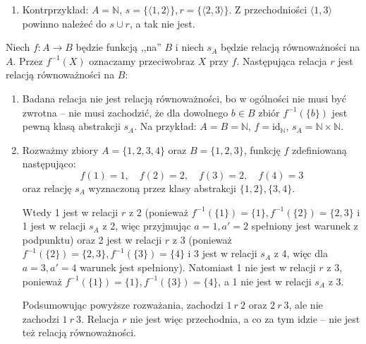 \begin{solutions}
\begin{enumerate}[\bf A.]
        \item Kontrprzykład: $A = \mathbb{N}$, $s = \{ \langle 1, 2 \rangle \}, r = \{ \langle 2, 3 \rangle \}$. Z przechodniości $\langle 1, 3 \rangle$ powinno należeć do $s \cup r$, a tak nie jest.
    \end{enumerate}

    \sol Niech $f:A\rightarrow B$ będzie funkcją ,,na'' $B$ i niech $s_A$ będzie relacją równoważności na $A$. Przez $f^{-1}(X)$ oznaczamy przeciwobraz $X$ przy $f$. Następująca relacja $r$ jest relacją równoważności na $B$:

    \begin{enumerate}[\bf A.]
        \item Badana relacja nie jest relacją równoważności, bo w ogólności nie musi być zwrotna -- nie musi zachodzić, że dla dowolnego $b \in B$ zbiór $f^{-1}(\{b\})$ jest pewną klasą abstrakcji $s_A$. Na przykład: $A = B = \mathbb{N}$, $f = \text{id}_{\mathbb{N}}$, $s_A = \mathbb{N} \times \mathbb{N}$.

        \item Rozważmy zbiory $A = \{1, 2, 3, 4\}$ oraz $B = \{1, 2, 3\}$, funkcję $f$ zdefiniowaną następująco:
        $$f(1) = 1, \quad f(2) = 2, \quad f(3) = 2, \quad f(4) = 3$$
        oraz relację $s_A$ wyznaczoną przez klasy abstrakcji $\{1, 2\}, \{3, 4\}$.
        
        Wtedy 1 jest w relacji $r$ z 2 (ponieważ $f^{-1}(\{1\}) = \{1\}, f^{-1}(\{2\}) = \{2, 3\}$ i 1 jest w relacji $s_A$ z 2, więc przyjmując $a = 1, a' = 2$ spełniony jest warunek z podpunktu) oraz 2 jest w relacji $r$ z 3 (ponieważ $f^{-1}(\{2\}) = \{2, 3\}, f^{-1}(\{3\}) = \{4\}$ i 3 jest w relacji $s_A$ z 4, więc dla $a = 3, a' = 4$ warunek jest spełniony). Natomiast 1 nie jest w relacji $r$ z 3, ponieważ $f^{-1}(\{1\}) = \{1\}, f^{-1}(\{3\}) = \{4\}$, a 1 nie jest w relacji $s_A$ z 3.
        
        Podsumowując powyższe rozważania, zachodzi $1 \ r \ 2$ oraz $2 \ r \ 3$, ale nie zachodzi $1 \ r \ 3$. Relacja $r$ nie jest więc przechodnia, a co za tym idzie -- nie jest też relacją równoważności.


\end{enumerate}
\end{solutions}
